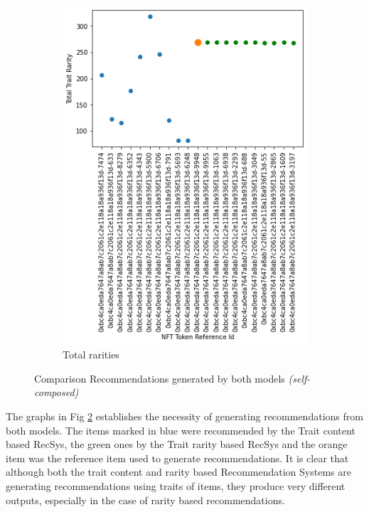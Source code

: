 \begin{figure}[h!]
\begin{subfigure}[b]{0.45\textwidth}
         \includegraphics[width=\textwidth]{images/Testing/trait/Total rarities content + rarity based.png}
         \caption{Total rarities}
         \label{fig:1-2}
     \end{subfigure}
     \hfill
        \caption{Comparison Recommendations generated by both models \textit{(self-composed)}}
        \label{fig:1}
\end{figure}

\noindent The graphs in Fig \ref{fig:1} establishes the necessity of generating recommendations from both models. The items marked in blue were recommended by the Trait content based RecSys, the green ones by the Trait rarity based RecSys and the orange item was the reference item used to generate recommendations.
It is clear that although both the trait content and rarity based Recommendation Systems are generating recommendations using traits of items, they produce very different outputs, especially in the case of rarity based recommendations.


